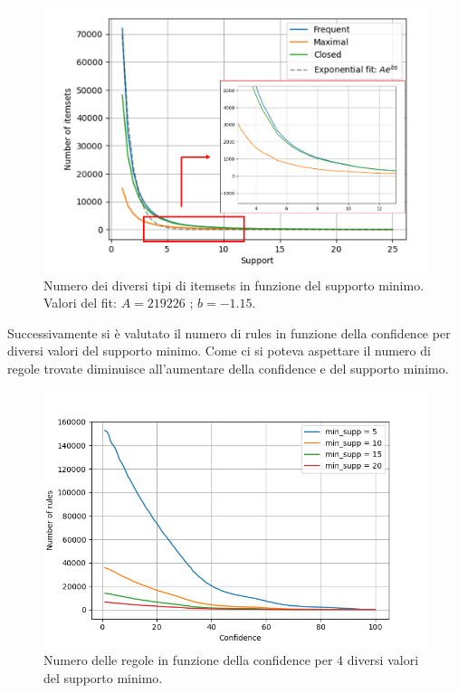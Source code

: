 \documentclass[a4paper,9pt]{article}
\begin{document}
\begin{figure}[H]
    \centering
    \includegraphics[scale=0.65]{Frequen,_maximal_and_closed_itemsets da inserire.png}
    \caption{Numero dei diversi tipi di itemsets in funzione del supporto minimo.\\Valori del fit: $A=219226$ ; $b=-1.15$. }
    \label{fig:my_label}
\end{figure}

Successivamente si è valutato il numero di rules in funzione della confidence per diversi valori del supporto minimo. Come ci si poteva aspettare il numero di regole trovate diminuisce all'aumentare della confidence e del supporto minimo.

\begin{figure}[H]
    \centering
    \includegraphics[scale=0.65]{Confidence_figure.png}
    \caption{Numero delle regole in funzione della confidence per $4$ diversi valori del supporto minimo.}
    \label{fig:my_label}
\end{figure}
\end{document}
